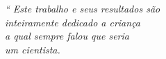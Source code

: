 \begin{epigrafe}
	\vspace*{\fill}
	\begin{flushright}
		\textit{``
		Este trabalho e seus resultados são
		\\ inteiramente dedicado a criança
		\\ a qual sempre falou que seria 
		\\ um cientista.}
	\end{flushright}
\end{epigrafe}
